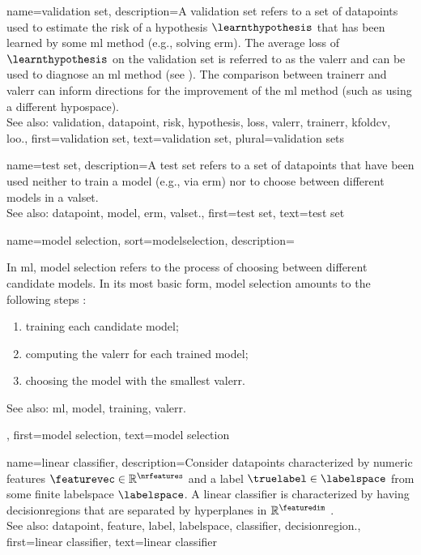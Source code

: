 {name={validation set},
 	description={A \gls{validation} set refers to a set of \glspl{datapoint} used to estimate 
  		the \gls{risk} of a \gls{hypothesis} $\learnthypothesis$ that has been learned by some 
  		\gls{ml} method (e.g., solving \gls{erm}). The average \gls{loss} of $\learnthypothesis$ 
  		on the \gls{validation} set is referred to as the \gls{valerr} and can be used to diagnose an 
  		\gls{ml} method (see \cite[Sec. 6.6]{MLBasics}). The comparison between \gls{trainerr} 
  		and \gls{valerr} can inform directions for the improvement of the \gls{ml} method (such as 
  		using a different \gls{hypospace}).
			\\
		See also: \gls{validation}, \gls{datapoint}, \gls{risk}, \gls{hypothesis}, \gls{loss}, \gls{valerr}, \gls{trainerr}, \gls{kfoldcv}, \gls{loo}.},
	first={validation set},
	text={validation set},
	plural={validation sets}
}

{name={test set},
	description={A test set refers to a set of \glspl{datapoint} that have  
		been used neither to train a \gls{model} (e.g., via \gls{erm}) nor 
		to choose between different \glspl{model} in a \gls{valset}.
				\\
		See also: \gls{datapoint}, \gls{model}, \gls{erm}, \gls{valset}.},
	first={test set},
	text={test set}  
}

{name={model selection},
sort={modelselection},
	description={In \gls{ml}, \gls{model} selection refers to the 
		process of choosing between different candidate \glspl{model}. In its most 
		basic form, \gls{model} selection amounts to the following steps \cite[Ch. 6]{MLBasics}: 
		\begin{enumerate}[label=\arabic*)]
			\item \gls{training} each candidate \gls{model}; 
			\item computing the \gls{valerr} for each trained \gls{model}; 
			\item choosing the \gls{model} with the smallest \gls{valerr}. 
		\end{enumerate}
		See also: \gls{ml}, \gls{model}, \gls{training}, \gls{valerr}.},
	first={model selection},
	text={model selection}  
}

{name={linear classifier}, 
	description={Consider \glspl{datapoint} characterized by numeric \glspl{feature} $\featurevec \in \mathbb{R}^{\nrfeatures}$ 
	    	and a \gls{label} $\truelabel \in \labelspace$ from some finite \gls{labelspace} $\labelspace$. 
		A linear \gls{classifier} is characterized by having \glspl{decisionregion} that are 
		separated by \glspl{hyperplane} in $\mathbb{R}^{\featuredim}$ \cite[Ch. 2]{MLBasics}.
				\\
		See also: \gls{datapoint}, \gls{feature}, \gls{label}, \gls{labelspace}, \gls{classifier}, \gls{decisionregion}.},
	first={linear classifier},
	text={linear classifier} 
}

